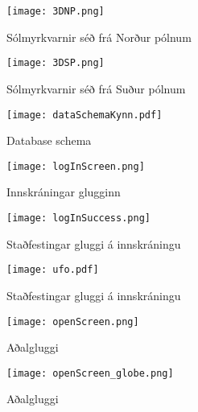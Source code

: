 \documentclass[12pt, git, final]{rureport}
\begin{document}
\begin{figure}
	\centering
	\texttt{[image: 3DNP.png]}
	\caption{Sólmyrkvarnir séð frá Norður pólnum}
	\label{fig:3DNP}
\end{figure}

\begin{figure}
	\centering
	\texttt{[image: 3DSP.png]}
	\caption{Sólmyrkvarnir séð frá Suður pólnum}
	\label{fig:3DSP}
\end{figure}

\begin{figure}
	\centering 
	\texttt{[image: dataSchemaKynn.pdf]}
	\caption{Database schema \label{fig:dataschema}}
\end{figure} 
%
\begin{figure}
	\centering 
	\texttt{[image: logInScreen.png]}
	\caption{Innskráningar glugginn \label{fig:logScreen}}
\end{figure} 

\begin{figure}
	\centering 
	\texttt{[image: logInSuccess.png]}
	\caption{Staðfestingar gluggi á innskráningu \label{fig:logsucces}}
\end{figure} 

\begin{figure}
	\centering 
	\texttt{[image: ufo.pdf]}
	\caption{Staðfestingar gluggi á innskráningu \label{fig:diagram}}
\end{figure}

\begin{figure}[t]
	\centering 
	\texttt{[image: openScreen.png]}
	\caption{Aðalgluggi \label{fig:openScreen}}
\end{figure} 
\begin{figure}[t]
	\centering 
	\texttt{[image: openScreen\_globe.png]}
	\caption{Aðalgluggi \label{fig:openScreen_globe}}
\end{figure} 

\clearpage

\printbibliography
\end{document}
